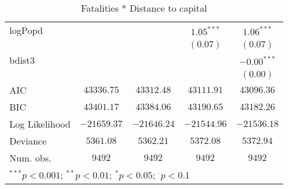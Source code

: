 \begin{sidewaystable}
\begin{center}
{\begin{tabular}{l c c c c}
logPopd              &               &                 & $1.05^{***}$  & $1.06^{***}$  \\
                     &               &                 & $(0.07)$      & $(0.07)$      \\
bdist3               &               &                 &               & $-0.00^{***}$ \\
                     &               &                 &               & $(0.00)$      \\
\hline
AIC                  & $43336.75$    & $43312.48$      & $43111.91$    & $43096.36$    \\
BIC                  & $43401.17$    & $43384.06$      & $43190.65$    & $43182.26$    \\
Log Likelihood       & $-21659.37$   & $-21646.24$     & $-21544.96$   & $-21536.18$   \\
Deviance             & $5361.08$     & $5362.21$       & $5372.08$     & $5372.94$     \\
Num. obs.            & $9492$        & $9492$          & $9492$        & $9492$        \\
\hline
\multicolumn{5}{l}{\scriptsize{$^{***}p<0.001$; $^{**}p<0.01$; $^{*}p<0.05$; $^{\cdot}p<0.1$}}
\end{tabular}
}
\caption{Fatalities * Distance to capital}
\label{interaction_deaths}
\end{center}
\end{sidewaystable}
